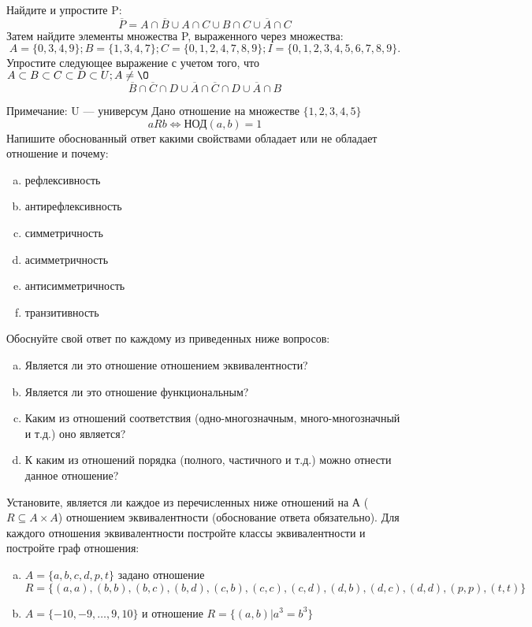 \documentclass[10pt]{exam}
\begin{document}
\begin{questions}
\question
Найдите и упростите P:
\begin{equation*}
\overline{P} = A \cap \overline{B} \cup A \cap C \cup B \cap C \cup \overline{A} \cap C
\end{equation*}
Затем найдите элементы множества P, выраженного через множества:
\begin{equation*}
A = \{0, 3, 4, 9\}; 
B = \{1, 3, 4, 7\};
C = \{0, 1, 2, 4, 7, 8, 9\};
I = \{0, 1, 2, 3, 4, 5, 6, 7, 8, 9\}.
\end{equation*}\question
Упростите следующее выражение с учетом того, что $A\subset B \subset C \subset D \subset U; A \neq \O$
\begin{equation*}
\overline{B} \cap \overline{C} \cap D \cup \overline{A} \cap \overline{C} \cap D \cup \overline{A} \cap B
\end{equation*}

Примечание: U — универсум\question
Дано отношение на множестве $\{1, 2, 3, 4, 5\}$ 
\begin{equation*}
aRb \iff  \text{НОД}(a,b) =1
\end{equation*}
Напишите обоснованный ответ какими свойствами обладает или не обладает отношение и почему:   
\begin{enumerate} [a)]\setcounter{enumi}{0}
\item рефлексивность
\item антирефлексивность
\item симметричность
\item асимметричность
\item антисимметричность
\item транзитивность
\end{enumerate}

Обоснуйте свой ответ по каждому из приведенных ниже вопросов:
\begin{enumerate} [a)]\setcounter{enumi}{0}
    \item Является ли это отношение отношением эквивалентности?
    \item Является ли это отношение функциональным?
    \item Каким из отношений соответствия (одно-многозначным, много-многозначный и т.д.) оно является?
    \item К каким из отношений порядка (полного, частичного и т.д.) можно отнести данное отношение?
\end{enumerate}


\question
Установите, является ли каждое из перечисленных ниже отношений на А ($R \subseteq A \times A$) отношением эквивалентности (обоснование ответа обязательно). Для каждого отношения эквивалентности постройте классы 
эквивалентности и постройте граф отношения:
\begin{enumerate} [a)]\setcounter{enumi}{0}
\item $A = \{a, b, c, d, p, t\}$ задано отношение $R = \{(a, a), (b, b), (b, c), (b, d), (c, b), (c, c), (c, d), (d, b), (d, c), (d, d), (p,p), (t,t)\}$
\item $A = \{-10, -9, … , 9, 10\}$ и отношение $R = \{(a,b)|a^{3} = b^{3}\}$


\end{enumerate}
\end{questions}
\end{document}
